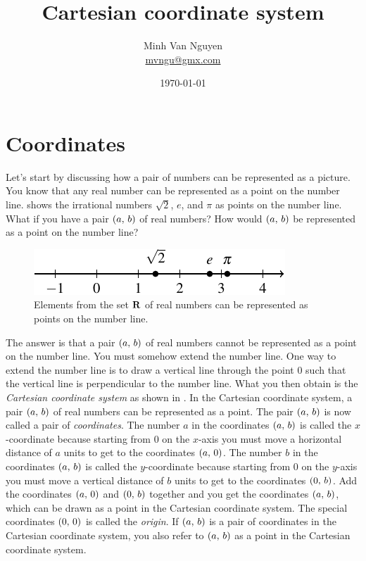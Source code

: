 \documentclass[a4paper,oneside,12pt]{article}
\begin{document}
\title{\Large\bf Cartesian coordinate system}
\author{%
  Minh Van Nguyen \\
  \url{mvngu@gmx.com}
}
\date{\today}
\maketitle



\section{Coordinates}

Let's start by discussing how a pair of numbers can be represented as
a picture.  You know that any real number can be represented as a
point on the number line.   shows the
irrational numbers $\sqrt{2}$, $e$, and $\pi$ as points on the number
line.  What if you have a pair $\left\lparen{a},\, {b}\right\rparen$ of real numbers?  How
would $\left\lparen{a},\, {b}\right\rparen$ be represented as a point on the number line?

\begin{figure}[!htbp]
\centering
\includegraphics[scale=1.1]{image/03/number-line.pdf}
\caption{%
  Elements from the set $\mathbf{R}$ of real numbers can be represented as
  points on the number line.
}
\label{fig:real_number_line}
\end{figure}

The answer is that a pair $\left\lparen{a},\, {b}\right\rparen$ of real numbers cannot be
represented as a point on the number line.  You must somehow extend
the number line.  One way to extend the number line is to draw a
vertical line through the point $0$ such that the vertical line is
perpendicular to the number line.  What you then obtain is the
\emph{Cartesian coordinate system} as shown in
.  In the Cartesian coordinate
system, a pair $\left\lparen{a},\, {b}\right\rparen$ of real numbers can be represented as a
point.  The pair $\left\lparen{a},\, {b}\right\rparen$ is now called a pair of
\emph{coordinates}.  The number $a$ in the coordinates $\left\lparen{a},\, {b}\right\rparen$
is called the $x$-coordinate because starting from $0$ on the
$x$-axis you must move a horizontal distance of $a$ units to get to
the coordinates $\left\lparen{a},\, {0}\right\rparen$.  The number $b$ in the coordinates
$\left\lparen{a},\, {b}\right\rparen$ is called the $y$-coordinate because starting from $0$
on the $y$-axis you must move a vertical distance of $b$ units to get
to the coordinates $\left\lparen{0},\, {b}\right\rparen$.  Add the coordinates $\left\lparen{a},\, {0}\right\rparen$
and $\left\lparen{0},\, {b}\right\rparen$ together and you get the coordinates
$\left\lparen{a},\, {b}\right\rparen$, which can be drawn as a point in the Cartesian
coordinate system.  The special coordinates $\left\lparen{0},\, {0}\right\rparen$ is called
the \emph{origin}.  If $\left\lparen{a},\, {b}\right\rparen$ is a pair of coordinates in the
Cartesian coordinate system, you also refer to $\left\lparen{a},\, {b}\right\rparen$ as a
point in the Cartesian coordinate system.
\end{document}
